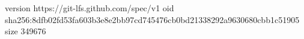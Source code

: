 version https://git-lfs.github.com/spec/v1
oid sha256:8dfb02fd53fa603b3e8e2bb97cd745476cb0bd21338292a9630680cbb1c51905
size 349676
